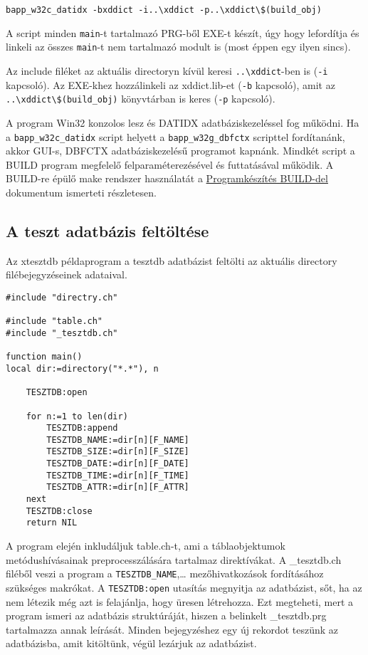 \begin{verbatim}
bapp_w32c_datidx -bxddict -i..\xddict -p..\xddict\$(build_obj)
\end{verbatim}

A script minden \verb'main'-t tartalmazó PRG-ből EXE-t készít,
úgy hogy lefordítja és linkeli az összes \verb'main'-t nem
tartalmazó modult is (most éppen egy ilyen sincs). 

Az include filéket az aktuális directoryn kívül
  keresi \verb'..\xddict'-ben is ({\tt -i} kapcsoló).
Az EXE-khez hozzálinkeli az xddict.lib-et ({\tt -b} kapcsoló),
amit az \verb'..\xddict\$(build_obj)' könyvtárban is keres ({\tt -p} kapcsoló).

A program Win32 konzolos lesz és DATIDX adatbáziskezeléssel fog működni.
Ha a \verb'bapp_w32c_datidx' script helyett a  
\verb'bapp_w32g_dbfctx' scripttel fordítanánk, akkor GUI-s, DBFCTX
adatbáziskezelésű programot kapnánk.
Mindkét script a BUILD program megfelelő felparaméterezésével és 
futtatásával működik. A BUILD-re épülő make rendszer
használatát a \href{build.html}{Programkészítés BUILD-del}
dokumentum ismerteti részletesen.


\subsection{A teszt adatbázis feltöltése}

Az xtesztdb példaprogram a tesztdb adatbázist feltölti az aktuális directory
filébejegyzéseinek adataival.

\begin{verbatim}
#include "directry.ch"

#include "table.ch"
#include "_tesztdb.ch"

function main()
local dir:=directory("*.*"), n

    TESZTDB:open
    
    for n:=1 to len(dir)
        TESZTDB:append
        TESZTDB_NAME:=dir[n][F_NAME]
        TESZTDB_SIZE:=dir[n][F_SIZE]
        TESZTDB_DATE:=dir[n][F_DATE]
        TESZTDB_TIME:=dir[n][F_TIME]
        TESZTDB_ATTR:=dir[n][F_ATTR]
    next
    TESZTDB:close
    return NIL
\end{verbatim}

A program elején inkludáljuk table.ch-t, ami a táblaobjektumok 
metódushívásainak preprocesszálására tartalmaz direktívákat.
A \_tesztdb.ch filéből veszi a program a \verb'TESZTDB_NAME',\ldots
mezőhivatkozások fordításához szükséges makrókat. A \verb'TESZTDB:open'
utasítás megnyitja az adatbázist, sőt, ha az nem létezik még azt is felajánlja,
hogy üresen létrehozza. Ezt megteheti, mert a program ismeri az adatbázis
struktúráját, hiszen a belinkelt \_tesztdb.prg tartalmazza annak leírását. 
Minden bejegyzéshez egy új rekordot teszünk az adatbázisba, amit kitöltünk,
végül lezárjuk az adatbázist.

